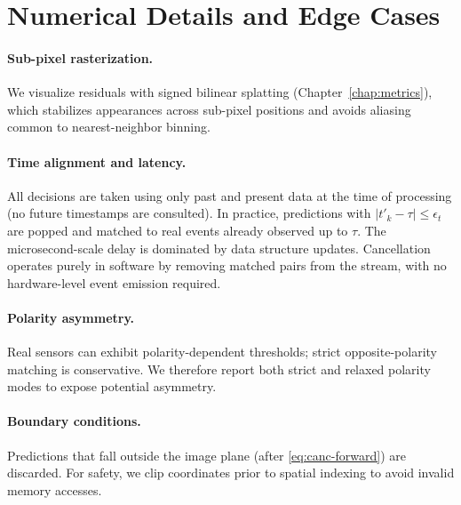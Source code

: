 \section{Numerical Details and Edge Cases}
\paragraph{Sub-pixel rasterization.}
We visualize residuals with signed bilinear splatting (Chapter~\ref{chap:metrics}), which stabilizes appearances across sub-pixel positions and avoids aliasing common to nearest-neighbor binning.

\paragraph{Time alignment and latency.}
All decisions are taken using only past and present data at the time of processing (no future timestamps are consulted). In practice, predictions with $|t'_k-\tau|\le \epsilon_t$ are popped and matched to real events already observed up to $\tau$. The microsecond-scale delay is dominated by data structure updates. Cancellation operates purely in software by removing matched pairs from the stream, with no hardware-level event emission required.

\paragraph{Polarity asymmetry.}
Real sensors can exhibit polarity-dependent thresholds; strict opposite-polarity matching is conservative. We therefore report both strict and relaxed polarity modes to expose potential asymmetry.

\paragraph{Boundary conditions.}
Predictions that fall outside the image plane (after \eqref{eq:canc-forward}) are discarded. For safety, we clip coordinates prior to spatial indexing to avoid invalid memory accesses.

